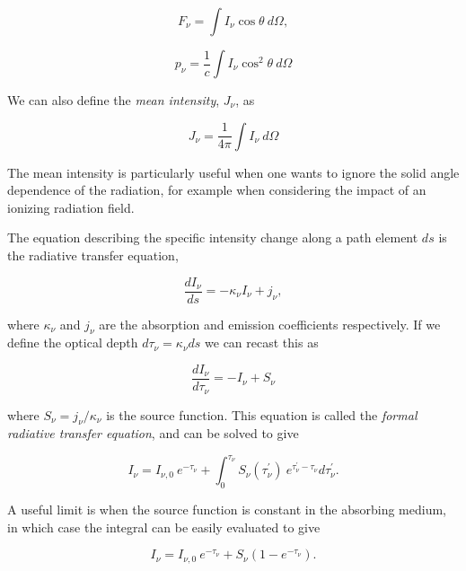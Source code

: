 \begin{equation}
F_\nu = \int I_\nu \cos \theta~d \Omega,
\end{equation}

\begin{equation}
p_\nu = \frac{1}{c} \int I_\nu \cos^2 \theta~d \Omega
\end{equation}

We can also define the {\em mean intensity}, $J_\nu$, as

\begin{equation}
J_\nu = \frac{1}{4 \pi} \int I_\nu~d \Omega
\end{equation}

The mean intensity is particularly
useful when one wants to ignore the solid angle dependence of the radiation,
for example when considering the impact of an ionizing radiation field.

The equation describing the specific intensity change along a path element $ds$
is the radiative transfer equation, 

\begin{equation}
\frac{d I_\nu}{ds} = -\kappa_\nu I_\nu + j_\nu, 
\end{equation}

where $\kappa_\nu$ and $j_\nu$ are the absorption and emission coefficients respectively.
If we define the optical depth $d \tau_\nu = \kappa_\nu ds$ we can recast this as

\begin{equation}
\frac{d I_\nu}{d \tau_\nu} = -I_\nu + S_\nu
\label{eq:formal_rte}
\end{equation}

where $S_\nu=j_\nu/\kappa_\nu$ is the source function. This equation
is called the {\em formal radiative transfer equation}, and can be solved to give 

\begin{equation}
I_\nu = I_{\nu,0}~e^{-\tau_\nu} + \int^{\tau_\nu}_0 S_\nu (\tau^\prime_\nu)~e^{\tau^\prime_\nu-\tau_\nu} d \tau^\prime_\nu.
\label{eq:rte_solution}
\end{equation}

A useful limit is when the source function is constant in the absorbing medium, in which case
the integral can be easily evaluated to give

\begin{equation}
I_\nu = I_{\nu,0}~e^{-\tau_\nu} + S_\nu (1 - e^{-\tau_\nu}).
\label{eq:rte_solution}
\end{equation}

